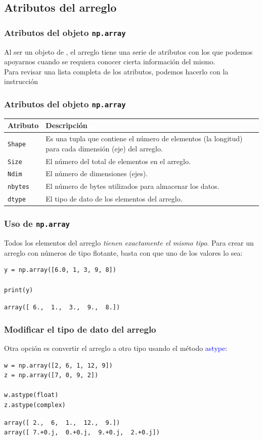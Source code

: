 \subsection{Atributos del arreglo}
\begin{frame}
\frametitle{Atributos del objeto \texttt{np.array}}
Al ser un objeto de \python, el arreglo tiene una serie de atributos con los que podemos apoyarnos cuando se requiera conocer cierta información del mismo.
\\
\bigskip
Para revisar una lista completa de los atributos, podemos hacerlo con la instrucción 
\end{frame}
\begin{frame}
\frametitle{Atributos del objeto \texttt{np.array}}
\fontsize{12}{12}\selectfont
\begin{table}
\begin{tabular}{l p{7cm}}
\textbf{Atributo} & \textbf{Descripción} \\ \hline
\texttt{Shape} & Es una tupla que contiene el número de elementos (la longitud) para cada dimensión (eje) del arreglo. \\ \hline
\texttt{Size} & El número del total de elementos en el arreglo. \\ \hline
\texttt{Ndim} & El número de dimensiones (ejes). \\ \hline
\texttt{nbytes} & El número de bytes utilizados para almacenar los datos. \\ \hline
\texttt{dtype} & El tipo de dato de los elementos del arreglo.
\end{tabular}
\end{table}
\end{frame}
\begin{frame}[fragile]
\frametitle{Uso de \texttt{np.array}}
Todos los elementos del arreglo \emph{tienen exactamente el mismo tipo}. Para crear un arreglo con números de tipo flotante, basta con que uno de los valores lo sea:
\pause
\begin{lstlisting}[caption=Ejemplo de cambio de tipo de dato en un arreglo, basicstyle=\linespread{1.1}\ttfamily=\small, columns=fullflexible]
y = np.array([6.0, 1, 3, 9, 8])

print(y)
\end{lstlisting}
\pause
\verb|array([ 6.,  1.,  3.,  9.,  8.])| 
\end{frame}
\begin{frame}[fragile]
\frametitle{Modificar el tipo de dato del arreglo}
Otra opción es convertir el arreglo a otro tipo usando el método \textcolor{blue}{astype}:
\begin{lstlisting}[caption=Ejemplo de cambio de tipo de dato en un arreglo, basicstyle=\linespread{1.1}\ttfamily=\small, columns=fullflexible]
w = np.array([2, 6, 1, 12, 9])
z = np.array([7, 0, 9, 2])

w.astype(float)
z.astype(complex)
\end{lstlisting}
\fontsize{12}{12}\selectfont
\pause
\verb|array([ 2.,  6,  1.,  12.,  9.])| \\
\pause
\verb|array([ 7.+0.j,  0.+0.j,  9.+0.j,  2.+0.j])|
\end{frame}
